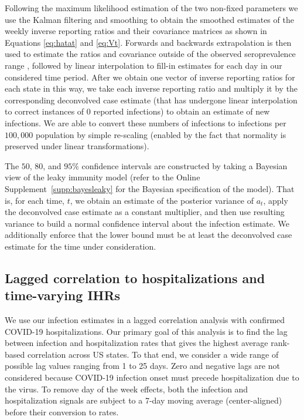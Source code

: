 \documentclass{article}
\begin{document}
Following the maximum likelihood estimation of the two non-fixed parameters
we use the Kalman filtering and smoothing to obtain the
smoothed estimates of the weekly inverse reporting ratios and
their covariance matrices as shown in Equations \ref{eq:hatat} and \ref{eq:Vt}.
Forwards and backwards extrapolation is then used to estimate the ratios and covariance
outside of the observed seroprevalence range \citep{durbin2012time}, followed by linear 
interpolation to fill-in estimates for each day in our considered time period. 
After we obtain one vector of inverse reporting ratios for each state in this
way, we take each inverse reporting ratio and multiply it by the corresponding
deconvolved case estimate (that has undergone linear interpolation to correct
instances of $0$ reported infections) to obtain an estimate of new infections.
We are able to convert these numbers of infections to
infections per $100,000$ population by simple re-scaling (enabled by the fact
that normality is preserved under linear transformations).

The $50$, $80$, and $95\%$ confidence intervals are constructed by taking a
Bayesian view of the leaky immunity model (refer to the Online
Supplement~\ref{supp:bayesleaky} for the Bayesian specification of the model). 
That is, for each time, $t$, we obtain an estimate of the
posterior variance of $a_t$, apply the deconvolved case estimate as a constant
multiplier, and then use resulting variance to build a normal confidence
interval about the infection estimate. We additionally enforce that the lower
bound must be at least the deconvolved case estimate for the time under consideration.

\subsection{Lagged correlation to hospitalizations and time-varying IHRs} 

We use our infection estimates in a lagged correlation analysis with
confirmed COVID-19 hospitalizations. Our primary goal of this analysis is to
find the lag between infection and hospitalization rates that gives the highest
average rank-based correlation across US states. To that end, we consider a wide
range of possible lag values ranging from 1 to 25 days. Zero and negative
lags are not considered because COVID-19 infection onset must precede
hospitalization due to the virus. To remove day of the week effects, both the
infection and hospitalization signals are subject to a 7-day moving
average (center-aligned) before their conversion to rates.
\end{document}
